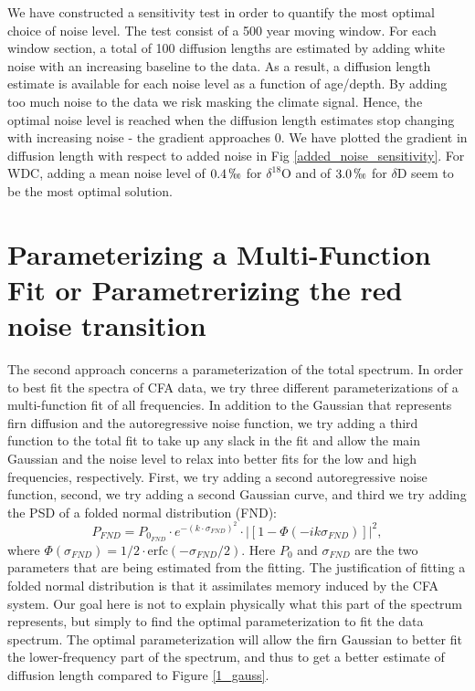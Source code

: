 \documentclass[draft, jgrga]{AGUTeX}
\begin{document}
\begin{article}
We have constructed a sensitivity test in order to quantify the most optimal choice of noise level.
The test consist of a 500 year moving window.
For each window section, a total of 100 diffusion lengths are estimated
by adding white noise with an increasing baseline to the data.
As a result, a diffusion length estimate is available for each noise level as a function of age/depth.
By adding too much noise to the data we risk masking the climate signal.
Hence, the optimal noise level is reached when the diffusion length estimates stop changing with increasing
noise - the gradient approaches 0.
We have plotted the gradient in diffusion length with respect to added noise in Fig \ref{added_noise_sensitivity}.
For WDC, adding a mean noise level of $0.4 \, \permil$ for $\delta^{18}$O  and of $3.0 \,\permil$ for $\delta$D seem
to be the most optimal solution.



\section{Parameterizing a Multi-Function Fit or Parametrerizing the red noise transition}
The second approach concerns a parameterization of the total spectrum. In order to best fit the spectra of CFA data, we try three different parameterizations of a multi-function fit of all frequencies. In addition to the Gaussian that represents firn diffusion and the autoregressive noise function, we try adding a third function to the total fit to take up any slack in the fit and allow the main Gaussian and the noise level to relax into better fits for the low and high frequencies, respectively. First, we try adding a second autoregressive noise function, second, we try adding a second Gaussian curve, and third we try adding the PSD of a folded normal distribution (FND):
\begin{equation}
P_{FND} = P_{0_{FND}} \cdot e^{-(k \cdot \sigma_{FND})^2} \cdot |\left[1 - \Phi(-i k \sigma_{FND})\right]|^2,
\end{equation}
where $\Phi(\sigma_{FND}) = 1/2\cdot \mathrm{erfc}(-\sigma_{FND}/2) $. Here $P_0$ and $\sigma_{FND}$ are the
two parameters that are being estimated from the fitting. The justification of fitting a folded normal distribution is that it assimilates memory induced by
the CFA system.
Our goal here is not to explain physically what this part of the spectrum represents, but simply to find the optimal parameterization to fit the data spectrum. The optimal parameterization will allow the firn Gaussian to better fit the lower-frequency part of the spectrum, and thus to get a better estimate of diffusion length compared to Figure \ref{1_gauss}.


\end{article}
\end{document}
